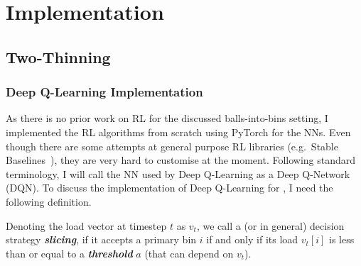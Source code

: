 \chapter{Implementation}\label{implementation}

\ifpdf
    \graphicspath{{Chapter3/Figs/Raster/}{Chapter3/Figs/PDF/}{Chapter3/Figs/}}
\else
    \graphicspath{{Chapter3/Figs/Vector/}{Chapter3/Figs/}}
\fi



\section{Two-Thinning}





\subsection{Deep Q-Learning Implementation} \label{dqn-implmentation-two-thinning}


As there is no prior work on RL for the discussed balls-into-bins setting, I implemented the RL algorithms from scratch using PyTorch for the NNs. Even though there are some attempts at general purpose RL libraries (e.g.\ Stable Baselines~\cite{hill2018stablebaselines}), they are very hard to customise at the moment. Following standard terminology, I will call the NN used by Deep Q-Learning as a Deep Q-Network (DQN). To discuss the implementation of Deep Q-Learning for \TwoThinning, I need the following definition.



\begin{definition} 
Denoting the load vector at timestep $t$ as $v_t$, we call a \TwoThinning (or \KThinning in general) decision strategy \textit{\textbf{slicing}}, if it accepts a primary bin $i$ if and only if its load $v_t[i]$ is less than or equal to a \textit{\textbf{threshold}} $a$ (that can depend on $v_t$).
\end{definition}

